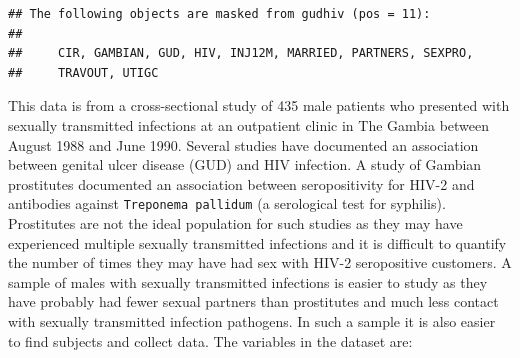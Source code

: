 \documentclass[12pt,]{book}
\theoremstyle{definition}
\theoremstyle{definition}
\theoremstyle{definition}
\theoremstyle{remark}
\begin{document}
\begin{verbatim}
## The following objects are masked from gudhiv (pos = 11):
## 
##     CIR, GAMBIAN, GUD, HIV, INJ12M, MARRIED, PARTNERS, SEXPRO,
##     TRAVOUT, UTIGC
\end{verbatim}

This data is from a cross-sectional study of 435 male patients who
presented with sexually transmitted infections at an outpatient clinic
in The Gambia between August 1988 and June 1990. Several studies have
documented an association between genital ulcer disease (GUD) and HIV
infection. A study of Gambian prostitutes documented an association
between seropositivity for HIV-2 and antibodies against
\texttt{Treponema\ pallidum} (a serological test for syphilis).
Prostitutes are not the ideal population for such studies as they may
have experienced multiple sexually transmitted infections and it is
difficult to quantify the number of times they may have had sex with
HIV-2 seropositive customers. A sample of males with sexually
transmitted infections is easier to study as they have probably had
fewer sexual partners than prostitutes and much less contact with
sexually transmitted infection pathogens. In such a sample it is also
easier to find subjects and collect data. The variables in the dataset
are:
\end{document}
